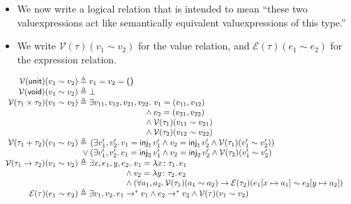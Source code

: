 \documentclass{lecturenotes}
\newcommand{\tabs}[3]{\ensuremath{\lambda #1 \colon #2.\,#3}}
\newcommand{\utype}{\textsf{unit}\xspace}
\newcommand{\unit}{\ensuremath{\textsf{(}\mkern0.5mu\textsf{)}}}
\newcommand{\prodtype}[2]{\ensuremath{#1 \times #2}}
\newcommand{\sumtype}[2]{\ensuremath{#1 + #2}}
\newcommand{\injl}[1]{\ensuremath{\textsf{inj}_1\mkern2mu#1}}
\newcommand{\injr}[1]{\ensuremath{\textsf{inj}_2\mkern3mu#1}}
\newcommand{\vtype}{\textsf{void}\xspace}
\begin{document}
\begin{itemize}
\item We now write a logical relation that is intended to mean ``these two valuexpressions act like semantically equivalent valuexpressions of this type.''
\item We write $\mathcal{V}(\tau)(v_1 \sim v_2)$ for the value relation, and $\mathcal{E}(\tau)(e_1 \sim e_2)$ for the expression relation.
\end{itemize}

$$
\begin{array}{r@{\;\triangleq\;}l}
  \mathcal{V}(\utype)(v_1 \sim v_2) & v_1 = v_2 = \unit\\
  \mathcal{V}(\vtype)(v_1 \sim v_2) & \bot\\
  \mathcal{V}(\prodtype{\tau_1}{\tau_2})(v_1 \sim v_2) & \exists v_{11}, v_{12}, v_{21}, v_{22}.\, \hspace{-1.5em}\begin{array}[t]{l}\hspace{1.15em}v_1 = (v_{11}, v_{12})\\ {} \land v_2 = (v_{21}, v_{22})\\ {} \land \mathcal{V}(\tau_1)(v_{11} \sim v_{21})\\ {} \land \mathcal{V}(\tau_2)(v_{12} \sim v_{22})\end{array}\\[1em]
  \mathcal{V}(\sumtype{\tau_1}{\tau_2})(v_1 \sim v_2) & \hspace{-1.5em}\begin{array}[t]{l}\hspace{1.15em}(\exists v'_1, v'_2.\, v_1 = \injl{v'_1} \land v_2 = \injl{v'_2} \land \mathcal{V}(\tau_1)(v'_1 \sim v'_2))\\ {} \lor (\exists v'_1, v'_2.\,v_1 = \injr{v'_1} \land v_2 = \injr{v'_2} \land \mathcal{V}(\tau_2)(v'_1 \sim v'_2)\end{array}\\
  \mathcal{V}(\tau_1 \to \tau_2)(v_1 \sim v_2) & \exists x, e_1, y, e_2.\, \hspace{-1.5em}\begin{array}[t]{l}\hspace{1.15em}v_1 = \tabs{x}{\tau_1}{e_1}\\{} \land v_2 = \tabs{y}{\tau_2}{e_2}\\{} \land (\forall a_1, a_2.\, \mathcal{V}(\tau_1)(a_1 \sim a_2) \to \mathcal{E}(\tau_2)(e_1[x \mapsto a_1] \sim e_2[y \mapsto a_2])\end{array}\\
  \mathcal{E}(\tau)(e_1 \sim e_2) & \exists v_1, v_2.\, e_1 \to^\ast v_1 \land e_2 \to^\ast v_2 \land \mathcal{V}(\tau)(v_1 \sim v_2)
\end{array}
$$
\end{document}
